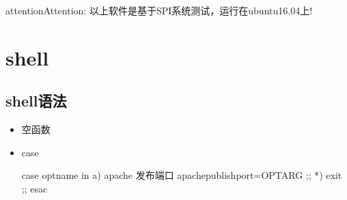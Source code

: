 \documentclass[a4paper,10pt,english]{sphinxmanual}
\begin{document}
\begin{sphinxadmonition}{attention}{Attention:}
以上软件是基于SPI系统测试，运行在ubuntu16.04上!
\end{sphinxadmonition}


\section{shell}
\label{\detokenize{linux/shell:shell}}\label{\detokenize{linux/shell::doc}}

\subsection{shell语法}
\label{\detokenize{linux/shell:id1}}\begin{itemize}
\item {} 
空函数

\begin{sphinxVerbatim}[commandchars=\\\{\}]
  
\end{sphinxVerbatim}

\item {} 
case

\begin{sphinxVerbatim}[commandchars=\\\{\}]
case \PYGZdq{}\PYGZdl{}optname\PYGZdq{} in
   \PYGZdq{}a\PYGZdq{})
       \PYGZsh{} apache 发布端口
      apache\PYGZus{}publish\PYGZus{}port=\PYGZdl{}OPTARG
       ;;
    *)
           exit
           ;;
esac
\end{sphinxVerbatim}

\end{itemize}
\end{document}
